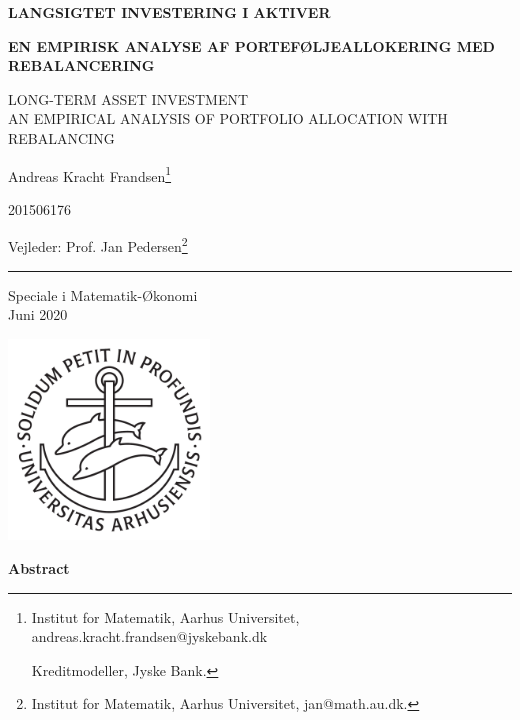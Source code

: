 \documentclass[
  a4paper,
  oneside]{memoir}
\author{}
\date{\vspace{-2.5em}}
\begin{document}
\begin{titlingpage}
\begin{center}
\vspace*{0.2cm}

\LARGE \textbf{LANGSIGTET INVESTERING I AKTIVER}

\vspace{3mm}

\renewcommand{\thefootnote}{\fnsymbol{footnote}}
\large \textbf{EN EMPIRISK ANALYSE AF PORTEFØLJEALLOKERING MED REBALANCERING}

\tiny LONG-TERM ASSET INVESTMENT\\ AN EMPIRICAL ANALYSIS OF PORTFOLIO ALLOCATION WITH REBALANCING

\vspace{2mm}

\Large Andreas Kracht Frandsen\footnote{Institut for Matematik, Aarhus Universitet, andreas.kracht.frandsen@jyskebank.dk

\vspace{1mm}
Kreditmodeller, Jyske Bank.}

\Large 201506176

\Large Vejleder: Prof. Jan Pedersen\footnote{Institut for Matematik, Aarhus Universitet, jan@math.au.dk.}

\vspace{2mm}

\rule{1cm}{0.4pt}

\vspace{2mm}

Speciale i Matematik-Økonomi\\
Juni 2020

\vfill

\includegraphics[width=0.4\textwidth]{latex/ausegl_sort.pdf}

\vfill

\textbf{Abstract}
\end{center}
\begin{center}
\begin{minipage}{15cm}
\lipsum[1-2]
\end{minipage}
\end{center}
\end{titlingpage}
\end{document}
